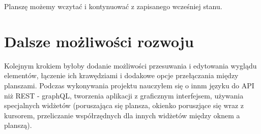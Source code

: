 \documentclass[a4paper,11pt]{article}
\begin{document}
Planszę możemy wczytać i kontynuować z zapisanego wcześniej stanu.

\section{Dalsze możliwości rozwoju}
Kolejnym krokiem byłoby dodanie możliwości przesuwania i edytowania wyglądu elementów, łączenie ich krawędziami i dodakowe opcje przełączania między planszami. Podczas wykonywania projektu nauczyłem się o innm języku do API niż REST - graphQL, tworzenia aplikacji z graficznym interfejsem, używania specjalnych widżetów (poruszająca się plansza, okienko poruszjące się wraz z kursorem, przeliczanie współrzędnych dla innych widżetów między oknem a planszą).
\end{document}

